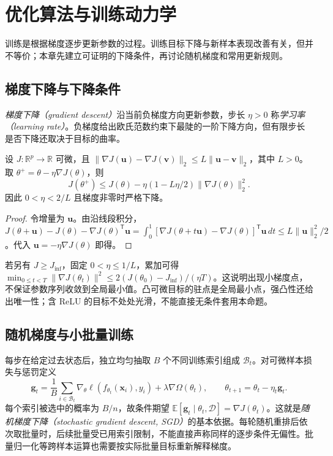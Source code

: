 \setcounter{chapter}{6} %
\chapter{优化算法与训练动力学}
\label{chap:dl-optimization}
训练是根据梯度逐步更新参数的过程。训练目标下降与新样本表现改善有关，但并不等价；本章先建立可证明的下降条件，再讨论随机梯度和常用更新规则。

\section{梯度下降与下降条件}
\emph{梯度下降（gradient descent）}沿当前负梯度方向更新参数，步长 $\eta>0$ 称\emph{学习率（learning rate）}。负梯度给出欧氏范数约束下最陡的一阶下降方向，但有限步长是否下降还取决于目标的曲率。
\begin{proposition}[光滑函数的单步下降]
设 $J:\mathbb R^p\to\mathbb R$ 可微，且 $\|\nabla J(\mathbf u)-\nabla J(\mathbf v)\|_2\leq L\|\mathbf u-\mathbf v\|_2$，其中 $L>0$。取 $\theta^+=\theta-\eta\nabla J(\theta)$，则
\begin{equation}
J(\theta^+)\leq J(\theta)-\eta(1-L\eta/2)\|\nabla J(\theta)\|_2^2.
\label{eq:dl-descent}
\end{equation}
因此 $0<\eta<2/L$ 且梯度非零时严格下降。
\end{proposition}
\begin{proof}
令增量为 $\mathbf u$。由沿线段积分，$J(\theta+\mathbf u)-J(\theta)-\nabla J(\theta)^\mathsf T\mathbf u=\int_0^1[\nabla J(\theta+t\mathbf u)-\nabla J(\theta)]^\mathsf T\mathbf u\,dt\leq L\|\mathbf u\|_2^2/2$。代入 $\mathbf u=-\eta\nabla J(\theta)$ 即得。
\end{proof}
若另有 $J\geq J_{\inf}$，固定 $0<\eta\leq1/L$，累加可得 $\min_{0\leq t<T}\|\nabla J(\theta_t)\|^2\leq2(J(\theta_0)-J_{\inf})/(\eta T)$。这说明出现小梯度点，不保证参数序列收敛到全局最小值。凸可微目标的驻点是全局最小点，强凸性还给出唯一性；含 ReLU 的目标不处处光滑，不能直接无条件套用本命题。

\section{随机梯度与小批量训练}
每步在给定过去状态后，独立均匀抽取 $B$ 个不同训练索引组成 $\mathcal B_t$。对可微样本损失与惩罚定义
\begin{equation}
\mathbf g_t=\frac1B\sum_{i\in\mathcal B_t}\nabla_\theta\ell(f_{\theta_t}(\mathbf x_i),y_i)+\lambda\nabla\Omega(\theta_t),
\qquad \theta_{t+1}=\theta_t-\eta_t\mathbf g_t.
\label{eq:dl-sgd}
\end{equation}
每个索引被选中的概率为 $B/n$，故条件期望 $\mathbb E[\mathbf g_t\mid\theta_t,\mathcal D]=\nabla J(\theta_t)$。这就是\emph{随机梯度下降（stochastic gradient descent, SGD）}的基本依据。每轮随机重排后依次取批量时，后续批量受已用索引限制，不能直接声称同样的逐步条件无偏性。批量归一化等跨样本运算也需要按实际批量目标重新解释梯度。

